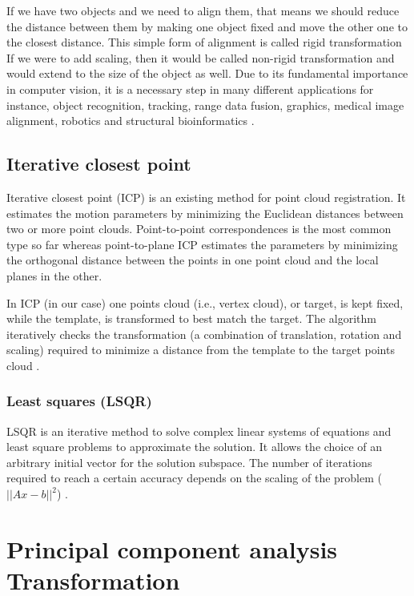 \documentclass[../structure.tex]{subfiles}
\begin{document}
If we have two objects and we need to align them, that means we should reduce the distance between them by making one object fixed and move the other one to the closest distance. This simple form of alignment is called rigid transformation If we were to add scaling, then it would be called non-rigid transformation and would extend to the size of the object as well. Due to its fundamental importance in computer vision, it is a necessary step in many different applications for instance, object recognition, tracking, range data fusion, graphics, medical image alignment, robotics and structural bioinformatics \cite{Li2007}.

		\subsection{Iterative closest point}
		
		Iterative closest point (ICP) is an existing method for point cloud registration.  It estimates the motion parameters by minimizing the Euclidean distances between two or more point clouds. Point-to-point correspondences is the most common type so far whereas point-to-plane ICP estimates the parameters by minimizing the orthogonal distance between the points in one point cloud and the local planes in the other.
		
In ICP (in our case) one points cloud (i.e., vertex cloud), or target, is kept fixed, while the template, is transformed to best match the target. The algorithm iteratively checks the transformation (a combination of translation, rotation and scaling) required to minimize a distance from the template to the target points cloud \cite{Zhang1994}.

		 \subsubsection{Least squares (LSQR)}
		
		 LSQR is an iterative method to solve complex linear systems of equations and least square problems to approximate the solution. It allows the choice of an arbitrary initial vector for the solution subspace. The number of iterations required to reach a certain accuracy depends on the scaling of the problem ($ ||Ax-b||^2 $) \cite{Paige1982a}.

\section{Principal component analysis Transformation}
\end{document}
